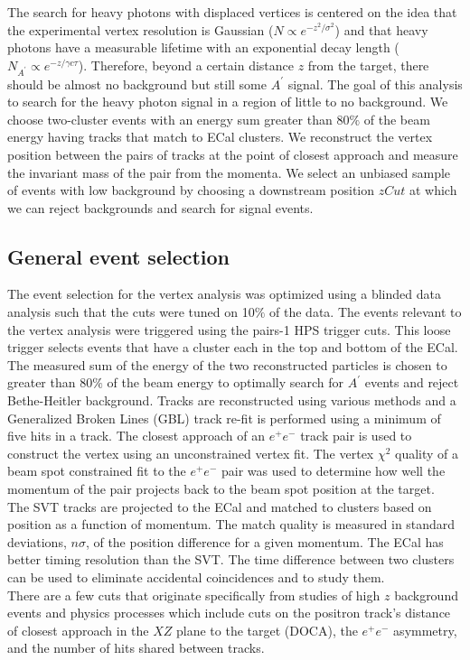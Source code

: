 The search for heavy photons with displaced vertices is centered on the idea that the experimental vertex resolution is Gaussian ($N\propto e^{-z^2/\sigma^2}$) and that heavy photons have a measurable lifetime with an exponential decay length ($N_{A^{\prime}}\propto e^{-z/\gamma c\tau}$). Therefore, beyond a certain distance $z$ from the target, there should be almost no background but still some $A^{\prime}$ signal. The goal of this analysis to search for the heavy photon signal in a region of little to no background. We choose two-cluster events with an energy sum greater than 80$\%$ of the beam energy having tracks that match to ECal clusters. We reconstruct the vertex position between the pairs of tracks at the point of closest approach and measure the invariant mass of the pair from the momenta. We select an unbiased sample of events with low background by choosing a downstream position $zCut$ at which we can reject backgrounds and search for signal events.\\

\subsection{General event selection}
The event selection for the vertex analysis was optimized using a blinded data analysis such that the cuts were tuned on 10$\%$ of the data. The events relevant to the vertex analysis were triggered using the pairs-1 HPS trigger cuts. This loose trigger selects events that have a cluster each in the top and bottom of the ECal. The measured sum of the energy of the two reconstructed particles is chosen to greater than 80$\%$ of the beam energy to optimally search for $A^{\prime}$ events and reject Bethe-Heitler background. Tracks are reconstructed using various methods and a Generalized Broken Lines (GBL) track re-fit is performed using a minimum of five hits in a track. The closest approach of an $e^+e^-$ track pair is used to construct the vertex using an unconstrained vertex fit. The vertex $\chi^2$ quality of a beam spot constrained fit to the $e^+e^-$ pair was used to determine how well the momentum of the pair projects back to the beam spot position at the target.\\  
\indent The SVT tracks are projected to the ECal and matched to clusters based on position as a function of momentum. The match quality is measured in standard deviations, $n\sigma$, of the position difference for a given momentum. The ECal has better timing resolution than the SVT. The time difference between two clusters can be used to eliminate accidental coincidences and to study them. \\
\indent There are a few cuts that originate specifically from studies of high $z$ background events and physics processes which include cuts on the positron track's distance of closest approach in the $XZ$ plane to the target (DOCA), the $e^+e^-$ asymmetry, and the number of hits shared between tracks. 

